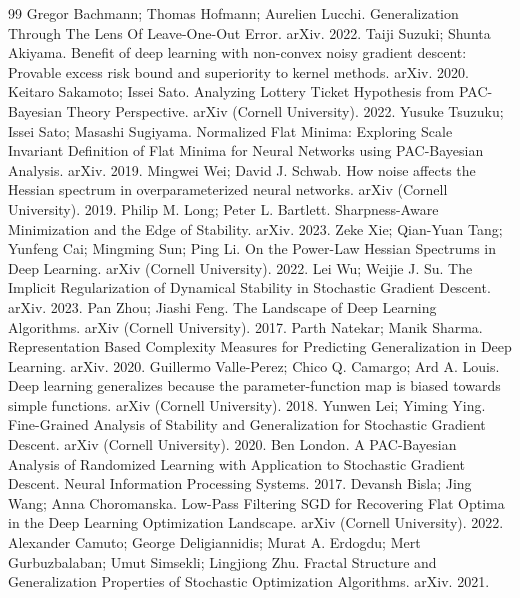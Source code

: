 \begin{thebibliography}{99}
 Gregor Bachmann; Thomas Hofmann; Aurelien Lucchi. Generalization Through The Lens Of Leave-One-Out Error. arXiv. 2022.
 Taiji Suzuki; Shunta Akiyama. Benefit of deep learning with non-convex noisy gradient descent: Provable excess risk bound and superiority to kernel methods. arXiv. 2020.
 Keitaro Sakamoto; Issei Sato. Analyzing Lottery Ticket Hypothesis from PAC-Bayesian Theory Perspective. arXiv (Cornell University). 2022.
 Yusuke Tsuzuku; Issei Sato; Masashi Sugiyama. Normalized Flat Minima: Exploring Scale Invariant Definition of Flat Minima for Neural Networks using PAC-Bayesian Analysis. arXiv. 2019.
 Mingwei Wei; David J. Schwab. How noise affects the Hessian spectrum in overparameterized neural networks. arXiv (Cornell University). 2019.
 Philip M. Long; Peter L. Bartlett. Sharpness-Aware Minimization and the Edge of Stability. arXiv. 2023.
 Zeke Xie; Qian-Yuan Tang; Yunfeng Cai; Mingming Sun; Ping Li. On the Power-Law Hessian Spectrums in Deep Learning. arXiv (Cornell University). 2022.
 Lei Wu; Weijie J. Su. The Implicit Regularization of Dynamical Stability in Stochastic Gradient Descent. arXiv. 2023.
 Pan Zhou; Jiashi Feng. The Landscape of Deep Learning Algorithms. arXiv (Cornell University). 2017.
 Parth Natekar; Manik Sharma. Representation Based Complexity Measures for Predicting Generalization in Deep Learning. arXiv. 2020.
 Guillermo Valle-Perez; Chico Q. Camargo; Ard A. Louis. Deep learning generalizes because the parameter-function map is biased towards simple functions. arXiv (Cornell University). 2018.
 Yunwen Lei; Yiming Ying. Fine-Grained Analysis of Stability and Generalization for Stochastic Gradient Descent. arXiv (Cornell University). 2020.
 Ben London. A PAC-Bayesian Analysis of Randomized Learning with Application to Stochastic Gradient Descent. Neural Information Processing Systems. 2017.
 Devansh Bisla; Jing Wang; Anna Choromanska. Low-Pass Filtering SGD for Recovering Flat Optima in the Deep Learning Optimization Landscape. arXiv (Cornell University). 2022.
 Alexander Camuto; George Deligiannidis; Murat A. Erdogdu; Mert Gurbuzbalaban; Umut Simsekli; Lingjiong Zhu. Fractal Structure and Generalization Properties of Stochastic Optimization Algorithms. arXiv. 2021.

\end{thebibliography}
